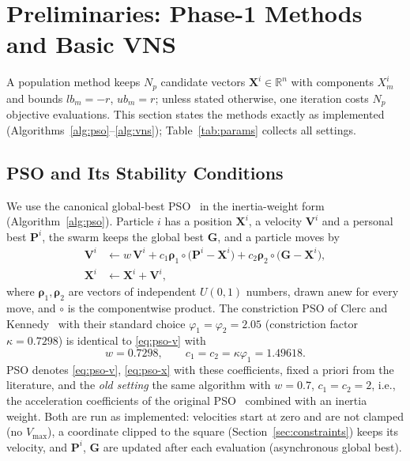 \section{Preliminaries: Phase-1 Methods and Basic VNS}
\label{sec:prelim}
\makeatletter{}\makeatother
A population method keeps $N_p$ candidate vectors $\mathbf X^i\in\mathbb R^{n}$ with components $X^i_m$ and bounds $lb_m=-r$, $ub_m=r$; unless stated otherwise, one iteration costs $N_p$ objective evaluations. This section states the methods exactly as implemented (Algorithms~\ref{alg:pso}--\ref{alg:vns}); Table~\ref{tab:params} collects all settings.

\subsection{PSO and Its Stability Conditions}
\label{sec:pso}
We use the canonical global-best PSO~\cite{Kennedy1995} in the inertia-weight form~\cite{Shi1998} (Algorithm~\ref{alg:pso}). Particle $i$ has a position $\mathbf X^i$, a velocity $\mathbf V^i$ and a personal best $\mathbf P^i$, the swarm keeps the global best $\mathbf G$, and a particle moves by
\begin{align}
\mathbf V^i&\leftarrow w\,\mathbf V^i+c_1\boldsymbol\rho_1\circ\bigl(\mathbf P^i-\mathbf X^i\bigr)+c_2\boldsymbol\rho_2\circ\bigl(\mathbf G-\mathbf X^i\bigr),\label{eq:pso-v}\\
\mathbf X^i&\leftarrow\mathbf X^i+\mathbf V^i,\label{eq:pso-x}
\end{align}
where $\boldsymbol\rho_1,\boldsymbol\rho_2$ are vectors of independent $U(0,1)$ numbers, drawn anew for every move, and $\circ$ is the componentwise product. The constriction PSO of Clerc and Kennedy~\cite{Clerc2002} with their standard choice $\varphi_1=\varphi_2=2.05$ (constriction factor $\kappa=0.7298$) is identical to \eqref{eq:pso-v} with
\begin{equation}
w=0.7298,\qquad c_1=c_2=\kappa\varphi_1=1.49618 .
\label{eq:constriction}
\end{equation}
PSO denotes \eqref{eq:pso-v}, \eqref{eq:pso-x} with these coefficients, fixed a priori from the literature, and the \emph{old setting} the same algorithm with $w=0.7$, $c_1=c_2=2$, i.e., the acceleration coefficients of the original PSO~\cite{Kennedy1995} combined with an inertia weight. Both are run as implemented: velocities start at zero and are not clamped (no $V_{\max}$), a coordinate clipped to the square (Section~\ref{sec:constraints}) keeps its velocity, and $\mathbf P^i$, $\mathbf G$ are updated after each evaluation (asynchronous global best).

